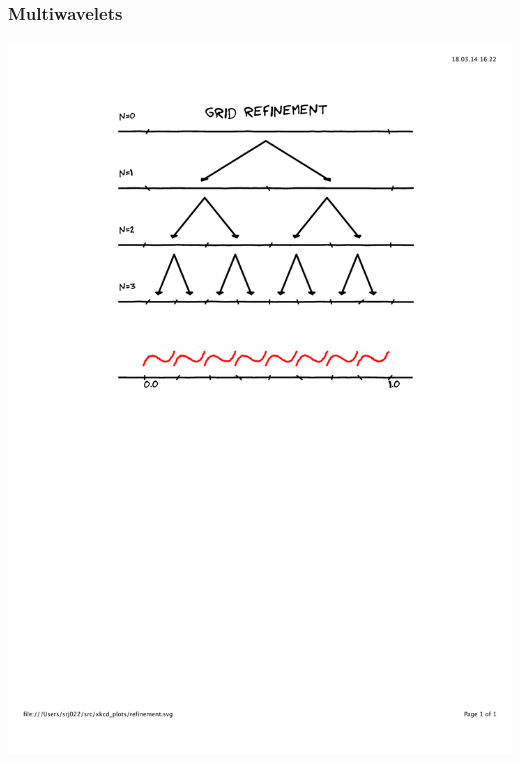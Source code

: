 \begin{frame}
    \frametitle{Multiwavelets}
    \centering
    \includegraphics[scale=0.5, clip, viewport=100 400 500 800]{figures/refinement.pdf}
\end{frame}

